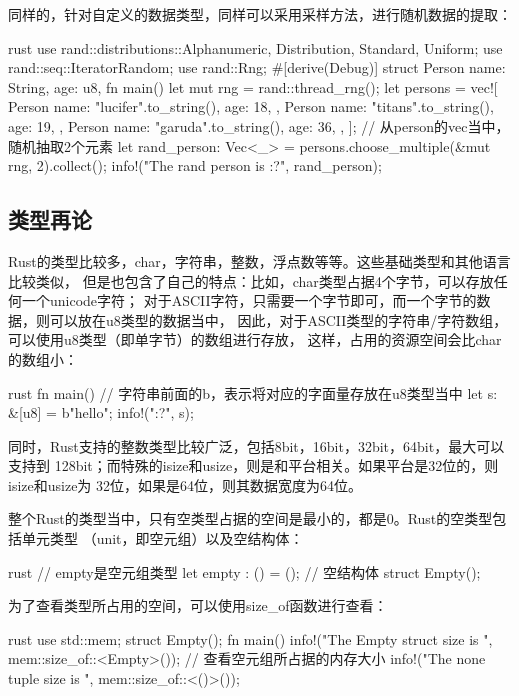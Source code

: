 同样的，针对自定义的数据类型，同样可以采用采样方法，进行随机数据的提取：
\begin{code-block}{rust}
use rand::distributions::{Alphanumeric, Distribution, Standard, Uniform};
use rand::seq::IteratorRandom;
use rand::Rng;
#[derive(Debug)]
struct Person {
    name: String,
    age: u8,
}
fn main() {
    let mut rng = rand::thread_rng();
    let persons = vec![
        Person {
            name: "lucifer".to_string(),
            age: 18,
        },
        Person {
            name: "titans".to_string(),
            age: 19,
        },
        Person {
            name: "garuda".to_string(),
            age: 36,
        },
    ];
    // 从person的vec当中，随机抽取2个元素
    let rand_person: Vec<_> = persons.choose_multiple(&mut rng, 2).collect();
    info!("The rand person is {:?}", rand_person);
}
\end{code-block}

\subsection{类型再论}
Rust的类型比较多，char，字符串，整数，浮点数等等。这些基础类型和其他语言比较类似，
但是也包含了自己的特点：比如，char类型占据4个字节，可以存放任何一个unicode字符；
对于ASCII字符，只需要一个字节即可，而一个字节的数据，则可以放在u8类型的数据当中，
因此，对于ASCII类型的字符串/字符数组，可以使用u8类型（即单字节）的数组进行存放，
这样，占用的资源空间会比char的数组小：
\begin{code-block}{rust}
fn main() {
    // 字符串前面的b，表示将对应的字面量存放在u8类型当中
    let s: &[u8] = b"hello";
    info!("{:?}", s);
}
\end{code-block}
同时，Rust支持的整数类型比较广泛，包括8bit，16bit，32bit，64bit，最大可以支持到
128bit；而特殊的isize和usize，则是和平台相关。如果平台是32位的，则isize和usize为
32位，如果是64位，则其数据宽度为64位。

整个Rust的类型当中，只有空类型占据的空间是最小的，都是0。Rust的空类型包括单元类型
（unit，即空元组）以及空结构体：
\begin{code-block}{rust}
// empty是空元组类型
let empty : () = ();
// 空结构体
struct Empty();
\end{code-block}
为了查看类型所占用的空间，可以使用size\_of函数进行查看：
\begin{code-block}{rust}
use std::mem;
struct Empty();
fn main() {
    info!("The Empty struct size is {}", mem::size_of::<Empty>());
    // 查看空元组所占据的内存大小
    info!("The none tuple size is {}", mem::size_of::<()>());
}
\end{code-block}

